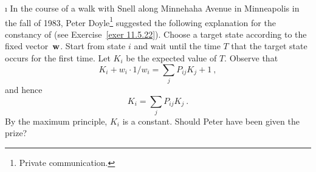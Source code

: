 \begin{LJSItem}
\i\label{exer 11.5.27} In the course of a walk with Snell along Minnehaha Avenue in Minneapolis
in the fall of 1983, Peter Doyle\footnote{Private
communication.} suggested the following explanation for the constancy of
 (see
Exercise~\ref{exer 11.5.22}).  Choose a target state according
to the fixed vector~${\mbox{\bf w}\/}$.  Start from state $i$ and wait until the time $T$ that
the target state occurs for the first time.  Let $K_i$ be the expected value
of $T$.  Observe that
$$
K_i + w_i \cdot 1/w_i= \sum_j P_{ij} K_j + 1\ ,
$$
and hence
$$
K_i = \sum_j P_{ij} K_j\ .
$$
By the maximum principle, $K_i$ is a constant.
Should Peter have been given the prize?
\end{LJSItem}


